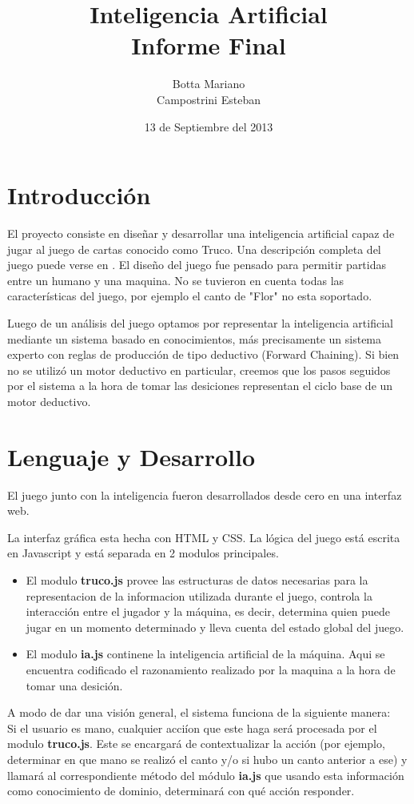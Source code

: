 \documentclass[12pt,a4paper]{article}
\title{Inteligencia Artificial\\ 
\large Informe Final
}
\author{Botta Mariano \\ Campostrini Esteban}
\date{ \small 13 de Septiembre del 2013}
\begin{document}
\maketitle 

\section{Introducci\'on}
El proyecto consiste en diseñar y desarrollar una inteligencia artificial capaz de jugar al juego de cartas conocido como Truco.
Una descripci\'on completa del juego puede verse en \cite{reglas}. El dise\~no del juego fue pensado para permitir partidas 
entre un humano y una maquina. No se tuvieron en cuenta todas las caracter\'isticas del juego, por ejemplo el canto de "Flor" 
no esta soportado. 

Luego de un an\'alisis del juego optamos por representar la inteligencia artificial mediante un sistema basado en conocimientos, 
más precisamente un sistema experto con reglas de producción de tipo deductivo (Forward Chaining). Si bien no se utiliz\'o un motor
deductivo en particular, creemos que los pasos seguidos por el sistema a la hora de tomar las desiciones representan el ciclo
base de un motor deductivo.


\section{Lenguaje y Desarrollo}
El juego junto con la inteligencia fueron desarrollados desde cero en una interfaz web. 

La interfaz gr\'afica esta hecha con HTML y CSS. La l\'ogica del juego est\'a escrita en Javascript y est\'a separada en 2 modulos principales.  
\begin{itemize}
\item El modulo \textbf{truco.js} provee las estructuras de datos necesarias para la representacion de la informacion utilizada durante el juego,
controla la interacci\'on entre el jugador y la m\'aquina, es decir, determina quien puede jugar en un momento determinado y lleva cuenta del
estado global del juego.

\item El modulo \textbf{ia.js} continene la inteligencia artificial de la m\'aquina. Aqui se encuentra codificado el razonamiento realizado por la maquina
a la hora de tomar una desici\'on.

\end{itemize}

A modo de dar una visi\'on general, el sistema funciona de la siguiente manera: \\
Si el usuario es mano, cualquier acci\'ion que este haga ser\'a procesada por el modulo \textbf{truco.js}. Este se encargar\'a de contextualizar la
acci\'on (por ejemplo, determinar en que mano se realiz\'o el canto y/o si hubo un canto anterior a ese) y llamar\'a al correspondiente m\'etodo del
m\'odulo \textbf{ia.js} que usando esta informaci\'on como conocimiento de dominio, determinar\'a con qu\'e acci\'on responder.
\end{document}
